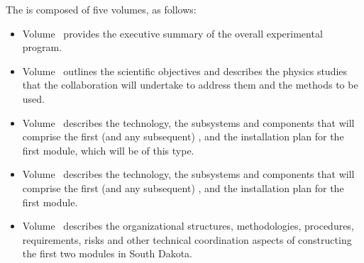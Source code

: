 The   is composed of five volumes, as follows:

\begin{itemize}
\item Volume~\volnumberexec{} provides the executive summary of the overall  experimental program.
\item Volume~\volnumberphysics{} outlines the scientific objectives and describes the physics studies that the  collaboration will undertake to address them and the methods to be used.
\item Volume~\volnumbersp{} describes the   technology, the subsystems and components that will comprise the first (and any subsequent)  , and the installation plan for the first  module, which will be of this type. 
\item Volume~\volnumberdp{} describes the   technology, the subsystems and components that will comprise the first (and any subsequent)  , and the installation plan for the first  module. 
\item Volume~\volnumbertc{} describes the organizational structures,  methodologies, procedures, requirements, risks and other technical  coordination aspects of constructing the first two  modules in South Dakota.
\end{itemize}
